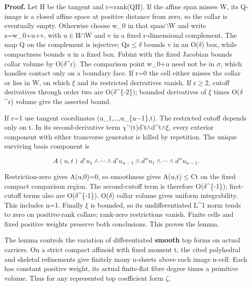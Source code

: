 \documentclass[
  10pt,
]{article}
\begin{document}
\textbf{Proof.} Let H be the tangent and r=rank(Q\textbar H). If the
affine span misses W, its Q-image is a closed affine space at positive
distance from zero, so the collar is eventually empty. Otherwise choose
w\_0 in that span\ensuremath{\cap}W and write z=w\_0+u+v, with u\ensuremath{\in}H\ensuremath{\cap}W and v in a fixed
r-dimensional complement. The map Q on the complement is injective;
\textbar Qz\textbar\ensuremath{\le}\ensuremath{\delta} bounds v in an O(\ensuremath{\delta}) box, while compactness bounds
u in a fixed box. Fubini with the fixed Jacobian bounds collar volume by
O(\ensuremath{\delta}\^{}r). The comparison point w\_0+u need not be in \ensuremath{\sigma}, which handles
contact only on a boundary face. If r=0 the cell either misses the
collar or lies in W, on which \ensuremath{\xi} and its restricted derivatives vanish.
If r\ensuremath{\ge}2, cutoff derivatives through order two are O(\ensuremath{\delta}\^{}\{-2\}); bounded
derivatives of \ensuremath{\xi} times O(\ensuremath{\delta}\^{}r) volume give the asserted bound.

If r=1 use tangent coordinates (u\_1,\ldots,u\_\{n\ensuremath{-}1\},t). The
restricted cutoff depends only on t. In its second-derivative term
\ensuremath{\chi}'`(t)d't\ensuremath{\wedge}d''t\ensuremath{\wedge}\ensuremath{\xi}, every exterior component with either transverse
generator is killed by repetition. The unique surviving basis component
is

\[
 A(u,t)\,d'u_1\wedge\cdots\wedge d'u_{n-1}
              \wedge d''u_1\wedge\cdots\wedge d''u_{n-1}.
\]

Restriction-zero gives A(u,0)=0, so smoothness gives
\textbar A(u,t)\textbar\ensuremath{\le}C\textbar t\textbar{} on the fixed compact
comparison region. The second-cutoff term is therefore O(\ensuremath{\delta}\^{}\{-1\});
first-cutoff terms also are O(\ensuremath{\delta}\^{}\{-1\}). O(\ensuremath{\delta}) collar volume gives
uniform integrability. This includes n=1. Finally \ensuremath{\xi} is bounded, so its
undifferentiated L\^{}1 norm tends to zero on positive-rank collars;
rank-zero restrictions vanish. Finite cells and fixed positive weights
preserve both conclusions. This proves the lemma.

The lemma controls the variation of differentiated \textbf{smooth} top
forms on actual carriers. On a strict compact affinoid with fixed moment
t, the cited polyhedral and skeletal refinements give finitely many
n-sheets above each image n-cell. Each has constant positive weight, its
actual finite-flat fibre degree times a primitive volume. Thus for any
represented top coefficient form \ensuremath{\zeta},
\end{document}
